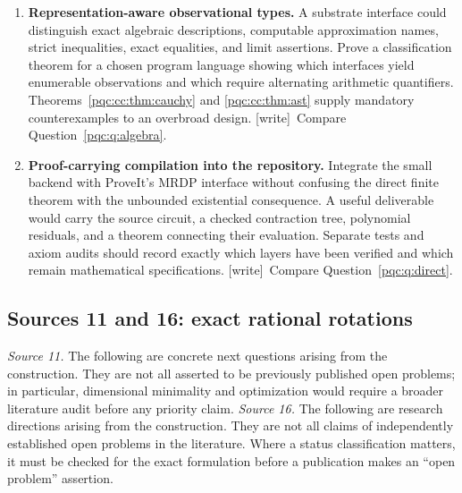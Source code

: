 \documentclass[11pt,letterpaper]{article}
\numberwithin{equation}{section}
\theoremstyle{definition}
\theoremstyle{remark}
\newcommand{\wtag}{\textup{[write]}}
\begin{document}
\begin{enumerate}[label=\textbf{\arabic*.},itemsep=0.7em]
\item \textbf{Representation-aware observational types.}
A substrate interface could distinguish exact algebraic descriptions,
computable approximation names, strict inequalities, exact equalities, and
limit assertions. Prove a classification theorem for a chosen program
language showing which interfaces yield enumerable observations and which
require alternating arithmetic quantifiers. Theorems~\ref{pqc:cc:thm:cauchy} and
\ref{pqc:cc:thm:ast} supply mandatory counterexamples to an overbroad design. \wtag\ Compare Question~\ref{pqc:q:algebra}.

\item \textbf{Proof-carrying compilation into the repository.}
Integrate the small backend with ProveIt's MRDP interface without confusing
the direct finite theorem with the unbounded existential consequence.
A useful deliverable would carry the source circuit, a checked contraction
tree, polynomial residuals, and a theorem connecting their evaluation.
Separate tests and axiom audits should record exactly which layers have been
verified and which remain mathematical specifications. \wtag\ Compare Question~\ref{pqc:q:direct}.
\end{enumerate}

\subsection{Sources 11 and 16: exact rational rotations}
\label{pqc:rr:sec:research}\label{pqc:dr:sec:future}
\emph{Source 11.}
The following are concrete next questions arising from the construction.
They are not all asserted to be previously published open problems; in
particular, dimensional minimality and optimization would require a
broader literature audit before any priority claim.
\emph{Source 16.}
The following are research directions arising from the construction.
They are not all claims of independently established open problems in
the literature. Where a status classification matters, it must be
checked for the exact formulation before a publication makes an
``open problem'' assertion.
\end{document}
